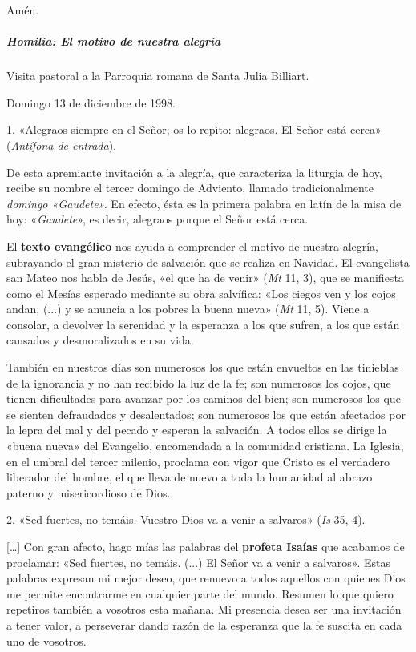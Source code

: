 \documentclass[]{article}
\let\oldsubparagraph\subparagraph
\renewcommand{\subparagraph}[1]{\oldsubparagraph{#1}\mbox{}}
\begin{document}
Amén.

\protect\hypertarget{_Toc448662745}{}{\protect\hypertarget{_Toc448690264}{}{\protect\hypertarget{_Toc448708287}{}{\protect\hypertarget{_Toc448709373}{}{\protect\hypertarget{_Toc449554375}{}{}}}}}

\subparagraph{Homilía: El motivo de nuestra
alegría}\label{homiluxeda-el-motivo-de-nuestra-alegruxeda}

Visita pastoral a la Parroquia romana de Santa Julia Billiart.

Domingo 13 de diciembre de 1998.

1. «Alegraos siempre en el Señor; os lo repito: alegraos. El Señor está
cerca» (\emph{Antífona de entrada}).

De esta apremiante invitación a la alegría, que caracteriza la liturgia
de hoy, recibe su nombre el tercer domingo de Adviento, llamado
tradicionalmente \emph{domingo «Gaudete».} En efecto, ésta es la primera
palabra en latín de la misa de hoy: «\emph{Gaudete}», es decir, alegraos
porque el Señor está cerca.

El \textbf{texto evangélico} nos ayuda a comprender el motivo de nuestra
alegría, subrayando el gran misterio de salvación que se realiza en
Navidad. El evangelista san Mateo nos habla de Jesús, «el que ha de
venir» (\emph{Mt} 11, 3), que se manifiesta como el Mesías esperado
mediante su obra salvífica: «Los ciegos ven y los cojos andan, (...) y
se anuncia a los pobres la buena nueva» (\emph{Mt} 11, 5). Viene a
consolar, a devolver la serenidad y la esperanza a los que sufren, a los
que están cansados y desmoralizados en su vida.

También en nuestros días son numerosos los que están envueltos en las
tinieblas de la ignorancia y no han recibido la luz de la fe; son
numerosos los cojos, que tienen dificultades para avanzar por los
caminos del bien; son numerosos los que se sienten defraudados y
desalentados; son numerosos los que están afectados por la lepra del mal
y del pecado y esperan la salvación. A todos ellos se dirige la «buena
nueva» del Evangelio, encomendada a la comunidad cristiana. La Iglesia,
en el umbral del tercer milenio, proclama con vigor que Cristo es el
verdadero liberador del hombre, el que lleva de nuevo a toda la
humanidad al abrazo paterno y misericordioso de Dios.

2. «Sed fuertes, no temáis. Vuestro Dios va a venir a salvaros»
(\emph{Is} 35, 4).

[\ldots{}] Con gran afecto, hago mías las palabras del \textbf{profeta
Isaías} que acabamos de proclamar: «Sed fuertes, no temáis. (...) El
Señor va a venir a salvaros». Estas palabras expresan mi mejor deseo,
que renuevo a todos aquellos con quienes Dios me permite encontrarme en
cualquier parte del mundo. Resumen lo que quiero repetiros también a
vosotros esta mañana. Mi presencia desea ser una invitación a tener
valor, a perseverar dando razón de la esperanza que la fe suscita en
cada uno de vosotros.
\end{document}
